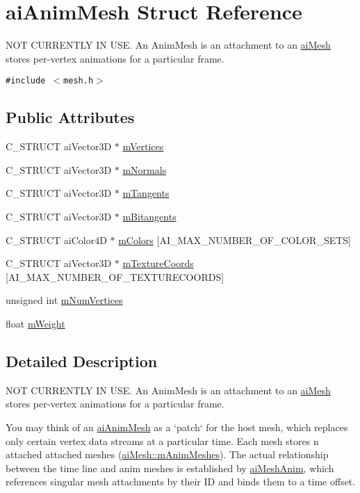 \hypertarget{structai_anim_mesh}{
\section{aiAnimMesh Struct Reference}
\label{structai_anim_mesh}
}
NOT CURRENTLY IN USE. An AnimMesh is an attachment to an \hyperlink{structai_mesh}{aiMesh} stores per-vertex animations for a particular frame.  


{\tt \#include $<$mesh.h$>$}

\subsection*{Public Attributes}
\begin{CompactItemize}
\item 
C\_\-STRUCT aiVector3D $\ast$ \hyperlink{structai_anim_mesh_0ac2dd4c1afd23e6a9293b1d0ded3060}{mVertices}
\item 
C\_\-STRUCT aiVector3D $\ast$ \hyperlink{structai_anim_mesh_64a07a8c5c419b1e006c5302bca4d334}{mNormals}
\item 
C\_\-STRUCT aiVector3D $\ast$ \hyperlink{structai_anim_mesh_95dcc49c6d5ecc570ceb54552a0a9625}{mTangents}
\item 
C\_\-STRUCT aiVector3D $\ast$ \hyperlink{structai_anim_mesh_7d60acf4d2b4b59dcc6c88956bfae85f}{mBitangents}
\item 
C\_\-STRUCT aiColor4D $\ast$ \hyperlink{structai_anim_mesh_4f062d9fac71c6b367fdf0f8638e1ca5}{mColors} \mbox{[}AI\_\-MAX\_\-NUMBER\_\-OF\_\-COLOR\_\-SETS\mbox{]}
\item 
C\_\-STRUCT aiVector3D $\ast$ \hyperlink{structai_anim_mesh_d24a0451adeb845a53eb2351b9462e0a}{mTextureCoords} \mbox{[}AI\_\-MAX\_\-NUMBER\_\-OF\_\-TEXTURECOORDS\mbox{]}
\item 
unsigned int \hyperlink{structai_anim_mesh_6bb0d45317a1bbea7f2b7f8191d0c436}{mNumVertices}
\item 
float \hyperlink{structai_anim_mesh_3554843cf6bb042369be1e75a2eff88a}{mWeight}
\end{CompactItemize}


\subsection{Detailed Description}
NOT CURRENTLY IN USE. An AnimMesh is an attachment to an \hyperlink{structai_mesh}{aiMesh} stores per-vertex animations for a particular frame. 

You may think of an \hyperlink{structai_anim_mesh}{aiAnimMesh} as a `patch` for the host mesh, which replaces only certain vertex data streams at a particular time. Each mesh stores n attached attached meshes (\hyperlink{structai_mesh_5078f7db7e99ed05db89dfa412f0e990}{aiMesh::mAnimMeshes}). The actual relationship between the time line and anim meshes is established by \hyperlink{structai_mesh_anim}{aiMeshAnim}, which references singular mesh attachments by their ID and binds them to a time offset. 

